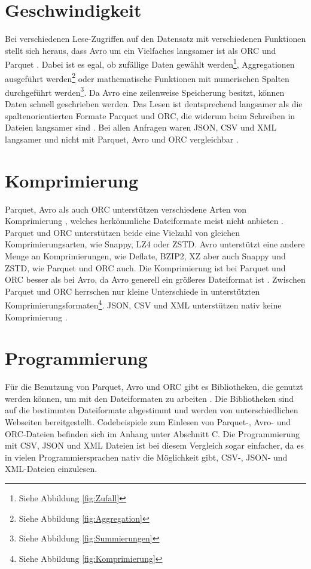 \section{Geschwindigkeit}
Bei verschiedenen Lese-Zugriffen auf den Datensatz mit verschiedenen Funktionen stellt sich heraus, dass Avro um ein Vielfaches langsamer ist als ORC und Parquet \cite[S. 908ff.]{gohil_compendious_2022}. Dabei ist es egal, ob zufällige Daten gewählt werden\footnote{Siehe Abbildung \ref{fig:Zufall}}, Aggregationen ausgeführt werden\footnote{Siehe Abbildung \ref{fig:Aggregation}} oder mathematische Funktionen mit numerischen Spalten durchgeführt werden\footnote{Siehe Abbildung \ref{fig:Summierungen}}.
Da Avro eine zeilenweise Speicherung besitzt, können Daten schnell geschrieben werden. Das Lesen ist dentsprechend langsamer als die spaltenorientierten Formate Parquet und ORC, die widerum beim Schreiben in Dateien langsamer sind \cite[S. 1665]{abadi_column-oriented_nodate}. Bei allen Anfragen waren JSON, CSV und XML langsamer und nicht mit Parquet, Avro und ORC vergleichbar \cite[S. 906ff.]{gohil_compendious_2022}.

\section{Komprimierung}
Parquet, Avro als auch ORC unterstützen verschiedene Arten von Komprimierung \cite[S. 268]{plase_comparison_2017}, welches herkömmliche Dateiformate meist nicht anbieten \cite[S. 553]{belov_analysis_2021}. Parquet und ORC unterstützen beide eine Vielzahl von gleichen Komprimierungsarten, wie Snappy, LZ4 oder ZSTD. Avro unterstützt eine andere Menge an Komprimierungen, wie Deflate, BZIP2, XZ aber auch Snappy und ZSTD, wie Parquet und ORC auch. Die Komprimierung ist bei Parquet und ORC besser als bei Avro, da Avro generell ein größeres Dateiformat ist \cite[S. 907]{gohil_compendious_2022}. Zwischen Parquet und ORC herrschen nur kleine Unterschiede in unterstützten Komprimierungsformaten\footnote{Siehe Abbildung \ref{fig:Komprimierung}}. JSON, CSV und XML unterstützen nativ keine Komprimierung \cite[S. 268]{plase_comparison_2017}.

\section{Programmierung}
Für die Benutzung von Parquet, Avro und ORC gibt es Bibliotheken, die genutzt werden können, um mit den Dateiformaten zu arbeiten \cite{javadoc_parquetreader_nodate} \cite{apache_datafilereader_nodate} \cite{orc_using_nodate}. Die Bibliotheken sind auf die bestimmten Dateiformate abgestimmt und werden von unterschiedlichen Webseiten bereitgestellt. Codebeispiele zum Einlesen von Parquet-, Avro- und ORC-Dateien befinden sich im Anhang unter Abschnitt C. Die Programmierung mit CSV, JSON und XML Dateien ist bei diesem Vergleich sogar einfacher, da es in vielen Programmiersprachen nativ die Möglichkeit gibt, CSV-, JSON- und XML-Dateien einzulesen. 

